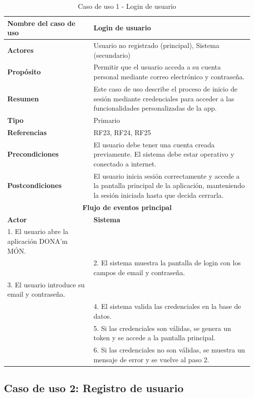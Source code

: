 \begin{table}[H]
\centering
\caption{Caso de uso 1 - Login de usuario}
\begin{tabular}{|p{4.5cm}|p{10.5cm}|}
\hline
\textbf{Nombre del caso de uso} & Login de usuario \\
\hline
\textbf{Actores} & Usuario no registrado (principal), Sistema (secundario) \\
\hline
\textbf{Propósito} & Permitir que el usuario acceda a su cuenta personal mediante correo electrónico y contraseña. \\
\hline
\textbf{Resumen} & Este caso de uso describe el proceso de inicio de sesión mediante credenciales para acceder a las funcionalidades personalizadas de la app. \\
\hline
\textbf{Tipo} & Primario \\
\hline
\textbf{Referencias} & RF23, RF24, RF25 \\
\hline
\textbf{Precondiciones} & El usuario debe tener una cuenta creada previamente. El sistema debe estar operativo y conectado a internet. \\
\hline
\textbf{Postcondiciones} & El usuario inicia sesión correctamente y accede a la pantalla principal de la aplicación, manteniendo la sesión iniciada hasta que decida cerrarla. \\
\hline
\multicolumn{2}{|c|}{\textbf{Flujo de eventos principal}} \\
\hline
\textbf{Actor} & \textbf{Sistema} \\
\hline
1. El usuario abre la aplicación DONA’m MÓN. & \\
\hline
& 2. El sistema muestra la pantalla de login con los campos de email y contraseña. \\
\hline
3. El usuario introduce su email y contraseña. & \\
\hline
& 4. El sistema valida las credenciales en la base de datos. \\
\hline
& 5. Si las credenciales son válidas, se genera un token y se accede a la pantalla principal. \\
\hline
& 6. Si las credenciales no son válidas, se muestra un mensaje de error y se vuelve al paso 2. \\
\hline
\end{tabular}
\end{table}


\subsection{Caso de uso 2: Registro de usuario}

